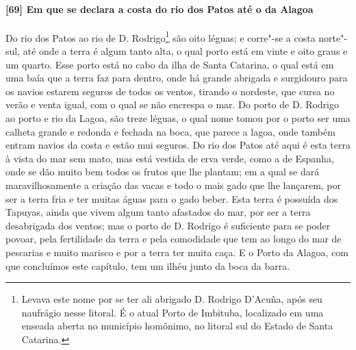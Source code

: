 \paragraph{[69] Em que se declara a costa do rio dos Patos até o da Alagoa} \quad
Do rio dos Patos ao rio de D. Rodrigo\footnote{ Levava este nome por se ter ali abrigado
D. Rodrigo D’Acuña, após seu naufrágio nesse litoral. É o atual Porto de Imbituba,
localizado em uma enseada aberta no município homônimo, no litoral sul do Estado de Santa
Catarina.} são oito léguas; e corre"-se a costa norte"-sul, até onde a terra é algum tanto
alta, o qual porto está em vinte e oito graus e um quarto. Esse porto está no cabo da ilha
de Santa Catarina, o qual está em uma baía que a terra faz para dentro, onde há grande
abrigada e surgidouro para os navios estarem seguros de todos os ventos, tirando o
nordeste, que cursa no verão e venta igual, com o qual se não encrespa o mar. Do porto de
D. Rodrigo ao porto e rio da Lagoa, são treze léguas, o qual nome tomou por o porto ser
uma calheta grande e redonda e fechada na boca, que parece a lagoa, onde também entram
navios da costa e estão mui seguros. Do rio dos Patos até aqui é esta terra à vista do mar
sem mato, mas está vestida de erva verde, como a de Espanha, onde se dão muito bem todos
os frutos que lhe plantam; em a qual se dará maravilhosamente a criação das vacas e todo o
mais gado que lhe lançarem, por ser a terra fria e ter muitas águas para o gado beber.
Esta terra é possuída dos Tapuyas, ainda que vivem algum tanto afastados do mar, por ser a
terra desabrigada dos ventos; mas o porto de D. Rodrigo é suficiente para se poder povoar,
pela fertilidade da terra e pela comodidade que tem ao longo do mar de pescarias e muito
marisco e por a terra ter muita caça. E o Porto da Alagoa, com que concluímos este
capítulo, tem um ilhéu junto da boca da barra.

